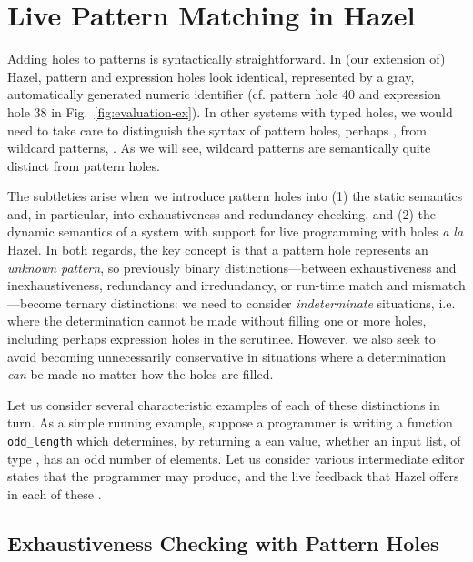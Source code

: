 \section{Live Pattern Matching in Hazel}\label{sec:examples}
Adding holes to patterns is syntactically straightforward. In (our extension of) Hazel, pattern and expression holes look identical, represented by a gray, automatically generated numeric identifier (cf. pattern hole 40 and expression hole 38 in Fig.~\ref{fig:evaluation-ex}). In other systems with typed holes, we would need to take care to distinguish the syntax of pattern holes, perhaps , from wildcard patterns, \li{_}. As we will see, wildcard patterns are semantically quite distinct from pattern holes.

The subtleties arise when we introduce pattern holes into (1) the static semantics and, in particular, into exhaustiveness and redundancy checking, and (2) the dynamic semantics of a system with support for live programming with holes \emph{a la} Hazel. In both regards, the key concept is that a pattern hole represents an \emph{unknown  pattern}, so previously binary distinctions---between exhaustiveness and inexhaustiveness, redundancy and irredundancy, or run-time match and mismatch---become ternary distinctions: we need to consider \emph{indeterminate} situations, i.e. where the determination cannot be made without filling one or more holes, including perhaps expression holes in the scrutinee. However, we also seek to avoid becoming unnecessarily conservative in situations where a determination \emph{can} be made no matter how the holes are filled.

Let us consider several characteristic examples of each of these distinctions in turn. As a simple running example, suppose a programmer is writing a function \texttt{odd\_length} which determines, by returning a ean value, whether an input list, of type \li{[Int]}, has an odd number of elements. Let us consider
various intermediate editor states that the programmer may produce, and the live feedback that Hazel offers in each of these \cite{Potter2020HazelTG}.

\subsection{Exhaustiveness Checking with Pattern Holes}
\label{sec:hazel-exhaustiveness}


